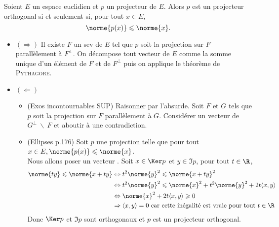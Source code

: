 \begin{prop}
    Soient $E$ un espace euclidien et $p$ un projecteur de $E$. Alors $p$ est un projecteur orthogonal si et seulement si, pour tout $x \in E$,
    $$\norme{p(x)} \leqslant \norme{x}.$$
\end{prop}

\begin{preuve}
    \begin{itemize}
        \item $(\Rightarrow)$ Il existe $F$ un sev de $E$ tel que $p$ soit la projection sur $F$ parallèlement à $F^\perp$. On décompose tout vecteur de $E$ comme la somme unique d'un élément de $F$ et de $F^\perp$ puis on applique le théorème de \textsc{Pythagore}. 
        \item $(\Leftarrow)$ 
        \begin{itemize}
            \item (Exos incontournables SUP) Raisonner par l'absurde. Soit $F$ et $G$ tels que $p$ soit la projection sur $F$ parallèlement à $G$. Considérer un vecteur de $G^\perp\ \backslash\ F$ et aboutir à une contradiction.
            \item (Ellipses p.176) Soit $p$ une projection telle que pour tout $x \in E, \norme{p(x)} \leqslant \norme{x}$. \\
            Nous allons poser un vecteur .
            Soit $x \in \Ker p$ et $y \in \Im p$, pour tout $t \in \R$, 
            \begin{align*}
                \norme{ty} \leqslant \norme{x + ty} &\Leftrightarrow t^2 \norme{y}^2 \leqslant \norme{x+ty}^2 \\
                &\Leftrightarrow t^2 \norme{y}^2 \leqslant \norme{x}^2 + t^2 \norme{y}^2 + 2t \langle x, y \rangle \\
                &\Leftrightarrow \norme{x}^2 + 2t \langle x, y \rangle \geqslant 0 \\
                &\Rightarrow \langle x, y \rangle = 0 \text{ car cette inégalité est vraie pour tout } t \in \R
            \end{align*}
            Donc $\Ker p$ et $\Im p$ sont orthogonaux et $p$ est un projecteur orthogonal.
        \end{itemize}
    \end{itemize}
\end{preuve}

